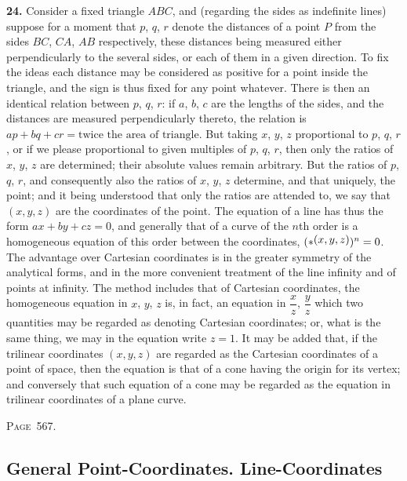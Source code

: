 \documentclass[11pt,a4paper]{book}
\begin{document}
\textbf{24.} Consider a fixed triangle $ABC$, and (regarding the sides as indefinite lines) suppose for a moment that $p$, $q$, $r$ denote the distances of a point $P$ from the sides $BC$, $CA$, $AB$ respectively, these distances being measured either perpendicularly to the several sides, or each of them in a given direction. To fix the ideas each distance may be considered as positive for a point inside the triangle, and the sign is thus fixed for any point whatever. There is then an identical relation between $p$, $q$, $r$: if $a$, $b$, $c$ are the lengths of the sides, and the distances are measured perpendicularly thereto, the relation is $ap+bq+cr=\text{twice the area of triangle}$. But taking $x$, $y$, $z$ proportional to $p$, $q$, $r$, or if we please proportional to given multiples of $p$, $q$, $r$, then only the ratios of $x$, $y$, $z$ are determined; their absolute values remain arbitrary. But the ratios of $p$, $q$, $r$, and consequently also the ratios of $x$, $y$, $z$ determine, and that uniquely, the point; and it being understood that only the ratios are attended to, we say that $(x,y,z)$ are the coordinates of the point. The equation of a line has thus the form $ax+by+cz=0$, and generally that of a curve of the $n$th order is a homogeneous equation of this order between the coordinates, $(*\,\raisebox{0.5ex}{\text{$\!(x,y,z)$}})^n=0$. The advantage over Cartesian coordinates is in the greater symmetry of the analytical forms, and in the more convenient treatment of the line infinity and of points at infinity. The method includes that of Cartesian coordinates, the homogeneous equation in $x$, $y$, $z$ is, in fact, an equation in $\dfrac{x}{z}$, $\dfrac{y}{z}$ which two quantities may be regarded as denoting Cartesian coordinates; or, what is the same thing, we may in the equation write $z=1$. It may be added that, if the trilinear coordinates $(x,y,z)$ are regarded as the Cartesian coordinates of a point of space, then the equation is that of a cone having the origin for its vertex; and conversely that such equation of a cone may be regarded as the equation in trilinear coordinates of a plane curve.

\newpage
\noindent\textsc{Page~567.} \subsection*{General Point-Coordinates. Line-Coordinates}
\end{document}
